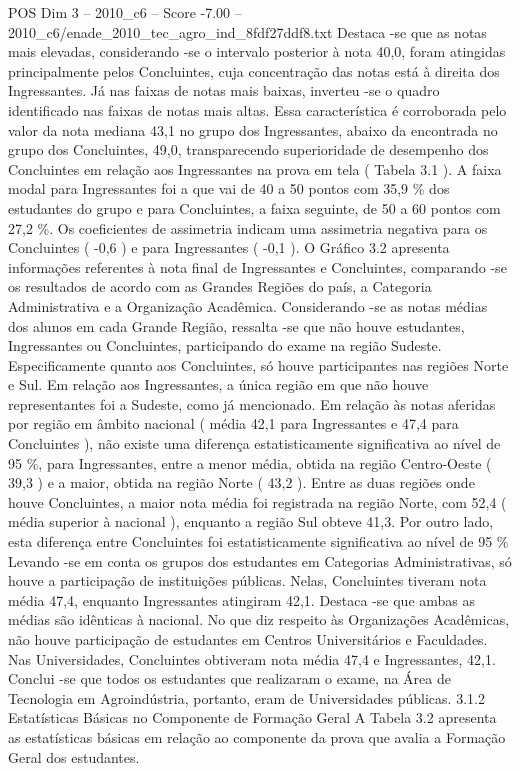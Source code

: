 \begin{textsample}{POS Dim 3 – 2010\_c6 – Score -7.00 – 2010\_c6/enade\_2010\_tec\_agro\_ind\_8fdf27ddf8.txt}
Destaca -se que as notas mais elevadas, considerando -se o intervalo posterior à nota 40,0, foram atingidas principalmente pelos Concluintes, cuja concentração das notas está à direita dos Ingressantes.
Já nas faixas de notas mais baixas, inverteu -se o quadro identificado nas faixas de notas mais altas.
Essa característica é corroborada pelo valor da nota mediana 43,1 no grupo dos Ingressantes, abaixo da encontrada no grupo dos Concluintes, 49,0, transparecendo superioridade de desempenho dos Concluintes em relação aos Ingressantes na prova em tela ( Tabela 3.1 ).
A faixa modal para Ingressantes foi a que vai de 40 a 50 pontos com 35,9 \% dos estudantes do grupo e para Concluintes, a faixa seguinte, de 50 a 60 pontos com 27,2 \%.
Os coeficientes de assimetria indicam uma assimetria negativa para os Concluintes ( -0,6 ) e para Ingressantes ( -0,1 ).
O Gráfico 3.2 apresenta informações referentes à nota final de Ingressantes e Concluintes, comparando -se os resultados de acordo com as Grandes Regiões do país, a Categoria Administrativa e a Organização Acadêmica.
Considerando -se as notas médias dos alunos em cada Grande Região, ressalta -se que não houve estudantes, Ingressantes ou Concluintes, participando do exame na região Sudeste.
Especificamente quanto aos Concluintes, só houve participantes nas regiões Norte e Sul.
Em relação aos Ingressantes, a única região em que não houve representantes foi a Sudeste, como já mencionado.
Em relação às notas aferidas por região em âmbito nacional ( média 42,1 para Ingressantes e 47,4 para Concluintes ), não existe uma diferença estatisticamente significativa ao nível de 95 \%, para Ingressantes, entre a menor média, obtida na região Centro-Oeste ( 39,3 ) e a maior, obtida na região Norte ( 43,2 ).
Entre as duas regiões onde houve Concluintes, a maior nota média foi registrada na região Norte, com 52,4 ( média superior à nacional ), enquanto a região Sul obteve 41,3.
Por outro lado, esta diferença entre Concluintes foi estatisticamente significativa ao nível de 95 \% Levando -se em conta os grupos dos estudantes em Categorias Administrativas, só houve a participação de instituições públicas.
Nelas, Concluintes tiveram nota média 47,4, enquanto Ingressantes atingiram 42,1.
Destaca -se que ambas as médias são idênticas à nacional.
No que diz respeito às Organizações Acadêmicas, não houve participação de estudantes em Centros Universitários e Faculdades.
Nas Universidades, Concluintes obtiveram nota média 47,4 e Ingressantes, 42,1.
Conclui -se que todos os estudantes que realizaram o exame, na Área de Tecnologia em Agroindústria, portanto, eram de Universidades públicas. 3.1.2 Estatísticas Básicas no Componente de Formação Geral A Tabela 3.2 apresenta as estatísticas básicas em relação ao componente da prova que avalia a Formação Geral dos estudantes.

\end{textsample}
